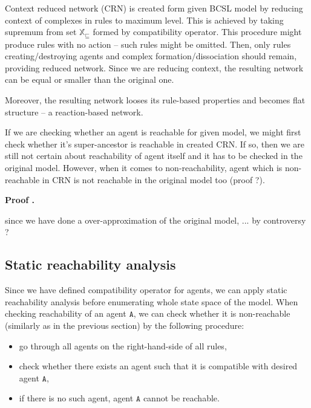 \documentclass[12pt]{fithesis2}
\newcounter{counter}[section]
\renewcommand{\thecounter}{\thesection.\arabic{counter}}
\newenvironment{proof}{\bigskip\refstepcounter{counter}\noindent\textbf{Proof \thecounter}\par\nopagebreak}{\bigskip}
\begin{document}
Context reduced network (CRN) is created form given BCSL model by reducing context of complexes in rules to maximum level. This is achieved by taking supremum from set $\mathds{X}_\sqsubseteq$ formed by compatibility operator. This procedure might produce rules with no action -- such rules might be omitted. Then, only rules creating/destroying agents and complex formation/dissociation should remain, providing reduced network. Since we are reducing context, the resulting network can be equal or smaller than the original one.

Moreover, the resulting network looses its rule-based properties and becomes flat structure -- a reaction-based network.

If we are checking whether an agent is reachable for given model, we might first check whether it's super-ancestor is reachable in created CRN. If so, then we are still not certain about reachability of agent itself and it has to be checked in the original model. However, when it comes to non-reachability, agent which is non-reachable in CRN is not reachable in the original model too (proof ?).

\begin{proof}
{since we have done a over-approximation of the original model, ... by controversy ?}
\end{proof}

\subsection{Static reachability analysis}

Since we have defined compatibility operator for agents, we can apply static reachability analysis before enumerating whole state space of the model. When checking reachability of an agent $\mathtt{A}$, we can check whether it is non-reachable (similarly as in the previous section) by the following procedure:

\begin{itemize}
\item go through all agents on the right-hand-side of all rules,
\item check whether there exists an agent such that it is compatible with desired agent $\mathtt{A}$,
\item if there is no such agent, agent $\mathtt{A}$ cannot be reachable.
\end{itemize}
\end{document}
